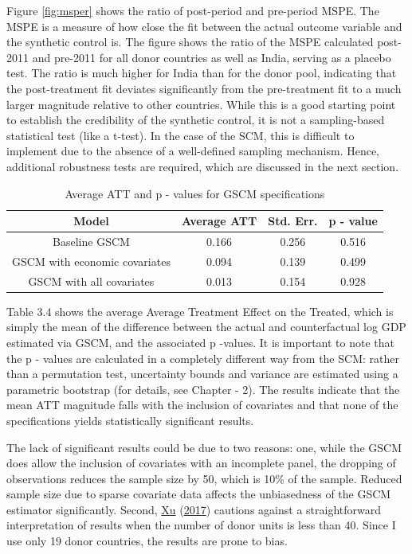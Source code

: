 \documentclass[12pt,nobind, a4paper]{reedthesis}
\begin{document}
 Figure \ref{fig:msper} shows the ratio of post-period and pre-period MSPE. The MSPE is a measure of how close the fit between the actual outcome variable and the synthetic control is. The figure shows the ratio of the MSPE calculated post-2011 and pre-2011 for all donor countries as well as India, serving as a placebo test. The ratio is much higher for India than for the donor pool, indicating that the post-treatment fit deviates significantly from the pre-treatment fit to a much larger magnitude relative to other countries. While this is a good starting point to establish the credibility of the synthetic control, it is not a sampling-based statistical test (like a t-test). In the case of the SCM, this is difficult to implement due to the absence of a well-defined sampling mechanism. Hence, additional robustness tests are required, which are discussed in the next section.
 \begin{table}[h!!]
 \centering
 \begin{tabular}{cccc}
 \hline
 Model & Average ATT & Std. Err. & p - value\\
 \hline
 Baseline GSCM&0.166& 0.256 & 0.516\\
 \hline
 GSCM with economic covariates & 0.094 & 0.139 & 0.499\\
 \hline
 GSCM with all covariates & 0.013 & 0.154 & 0.928\\
 \hline
 \end{tabular}
 \caption{ Average ATT and p - values for GSCM specifications}
 \end{table}
 Table 3.4 shows the average Average Treatment Effect on the Treated, which is simply the mean of the difference between the actual and counterfactual log GDP estimated via GSCM, and the associated p -values. It is important to note that the p - values are calculated in a completely different way from the SCM: rather than a permutation test, uncertainty bounds and variance are estimated using a parametric bootstrap (for details, see Chapter - 2). The results indicate that the mean ATT magnitude falls with the inclusion of covariates and that none of the specifications yields statistically significant results.
 \linebreak

 The lack of significant results could be due to two reasons: one, while the GSCM does allow the inclusion of covariates with an incomplete panel, the dropping of observations reduces the sample size by 50, which is 10\% of the sample. Reduced sample size due to sparse covariate data affects the unbiasedness of the GSCM estimator significantly. Second, \protect\hyperlink{ref-xu_generalized_2017}{Xu} (\protect\hyperlink{ref-xu_generalized_2017}{2017}) cautions against a straightforward interpretation of results when the number of donor units is less than 40. Since I use only 19 donor countries, the results are prone to bias.
\end{document}
